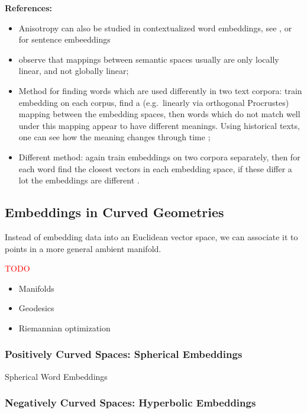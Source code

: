 \documentclass[11pt, a4paper]{amsart}
\begin{document}
\noindent \textbf{References:}
\begin{itemize}
	\item Anisotropy can also be studied in contextualized word embeddings, see \cite{ethayarajh-2019-contextual}, or for sentence embeeddings \cite{li-etal-2020-sentence}
	\item \cite{nakashole-flauger-2018-characterizing} observe that mappings between semantic spaces usually are only locally linear, and not globally linear;
	\item Method for finding words which are used differently in two text corpora:
	train embedding on each corpus, find a (e.g.\ linearly via orthogonal Procrustes) mapping between the embedding spaces, then words which do not match well under this mapping appear to have different meanings.
	Using historical texts, one can see how the meaning changes through time \cite{hamilton-etal-2016-diachronic};
	\item Different method:
	again train embeddings on two corpora separately, then for each word find the closest vectors in each embedding space, if these differ a lot the embeddings are different \cite{gonen-etal-2020-simple}.
\end{itemize}


\subsection{Embeddings in Curved Geometries}

 Instead of embedding data into an Euclidean vector space, we can associate it to points in a more general ambient manifold.

\textcolor{red}{TODO} 
\begin{itemize}
	\item Manifolds
	\item Geodesics
	\item Riemannian optimization
\end{itemize}

\subsubsection{Positively Curved Spaces: Spherical Embeddings}

Spherical Word Embeddings \cite{Meng2019SphericalTE}



\subsubsection{Negatively Curved Spaces: Hyperbolic Embeddings}
\end{document}
